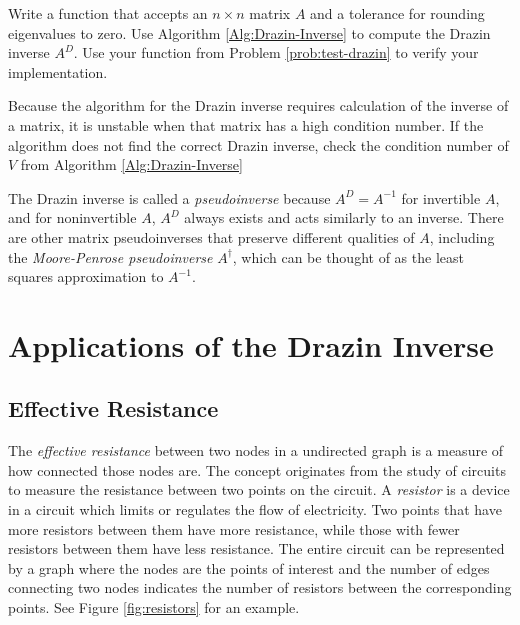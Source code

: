 \begin{problem} %
Write a function that accepts an $n \times n$ matrix $A$ and a tolerance for rounding eigenvalues to zero.
Use Algorithm \ref{Alg:Drazin-Inverse} to compute the Drazin inverse $A^D$.
Use your function from Problem \ref{prob:test-drazin} to verify your implementation.
\end{problem}

\begin{warn} %
Because the algorithm for the Drazin inverse requires calculation of the inverse of a matrix, it is unstable when that matrix has a high condition number.
If the algorithm does not find the correct Drazin inverse, check the condition number of $V$ from Algorithm \ref{Alg:Drazin-Inverse}
\end{warn}

\begin{info}
The Drazin inverse is called a \emph{pseudoinverse} because $A^D = A^{-1}$ for invertible $A$, and for noninvertible $A$, $A^D$ always exists and acts similarly to an inverse.
There are other matrix pseudoinverses that preserve different qualities of $A$, including the \emph{Moore-Penrose pseudoinverse} $A^\dagger$, which can be thought of as the least squares approximation to $A^{-1}$.
\end{info}

\section*{Applications of the Drazin Inverse} %

\subsection*{Effective Resistance} %

The \emph{effective resistance} between two nodes in a undirected graph is a measure of how connected those nodes are.
The concept originates from the study of circuits to measure the resistance between two points on the circuit.
A \emph{resistor} is a device in a circuit which limits or regulates the flow of electricity.
Two points that have more resistors between them have more resistance, while those with fewer resistors between them have less resistance.
The entire circuit can be represented by a graph where the nodes are the points of interest and the number of edges connecting two nodes indicates the number of resistors between the corresponding points.
See Figure \ref{fig:resistors} for an example.

